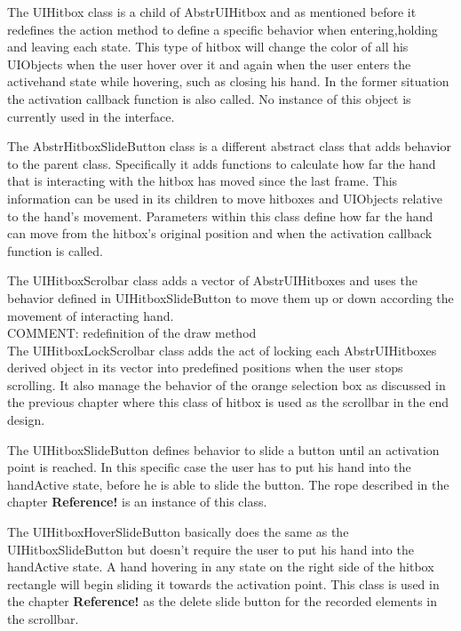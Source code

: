 The UI\textunderscore Hitbox class is a child of Abstr\textunderscore UI\textunderscore Hitbox and as mentioned before it redefines the action method to define a specific behavior when entering,holding and leaving each state. This type of hitbox will change the color of all his UI\textunderscore Objects when the user hover over it and again when the user enters the activehand state while hovering, such as closing his hand. In the former situation the activation callback function is also called. No instance of this object is currently used in the interface.

The Abstr\textunderscore HitboxSlideButton class is a different abstract class that adds behavior to the parent class. Specifically it adds functions to calculate how far the hand that is interacting with the hitbox has moved since the last frame. This information can be used in its children to move hitboxes and UI\textunderscore Objects relative to the hand's movement. Parameters within this class define how far the hand can move from the hitbox's original position and when the activation callback function is called.

The UI\textunderscore HitboxScrolbar class adds a vector of Abstr\textunderscore UI\textunderscore Hitboxes and uses the behavior defined in UI\textunderscore HitboxSlideButton to move them up or down according the movement of interacting hand. \\
{\large COMMENT: redefinition of the draw method} \\

The UI\textunderscore HitboxLockScrolbar class adds the act of locking each Abstr\textunderscore UI\textunderscore Hitboxes derived object in its vector into predefined positions when the user stops scrolling. It also manage the behavior of the orange selection box as discussed in the previous chapter where this class of hitbox is used as the scrollbar in the end design.

The UI\textunderscore HitboxSlideButton defines behavior to slide a button until an activation point is reached. In this specific case the user has to put his hand into the handActive state, before he is able to slide the button. The rope described in the chapter \textbf{Reference!} is an instance of this class.

The UI\textunderscore HitboxHoverSlideButton basically does the same as the UI\textunderscore HitboxSlideButton but doesn't require the user to put his hand into the handActive state. A hand hovering in any state on the right side of the hitbox rectangle will begin sliding it towards the activation point. This class is used in the chapter \textbf{Reference!} as the delete slide button for the recorded elements in the scrollbar.

